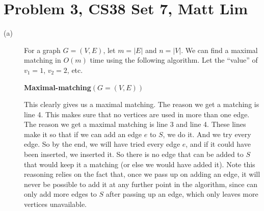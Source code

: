 \documentclass{article}
\begin{document}
\section*{Problem 3, CS38 Set 7, Matt Lim}
\begin{description}
    \item[(a)]
        For a graph $G = (V,E)$, let $m = |E|$ and $n = |V|$.
        We can find a maximal matching in $O(m)$ time using the following
        algorithm. Let the ``value'' of $v_1 = 1$, $v_2 = 2$, etc.

        \vspace{5mm}
        \noindent \textbf{Maximal-matching}$(G = (V,E))$

        This clearly gives us a maximal matching. The reason we get a
        matching is line 4. This makes sure that no vertices are used
        in more than one edge. The reason we get a maximal matching is
        line 3 and line 4. These lines make it so that if we can add an edge $e$
        to $S$, we do it. And we try every edge. So by the end, we will have
        tried every edge $e$, and if it could have been inserted, we inserted it. So
        there is no edge that can be added to $S$ that would keep it a matching
        (or else we would have added it). Note this reasoning relies on the fact
        that, once we pass up on adding an edge, it will never be possible to add
        it at any further point in the algorithm, since can only add more edges
        to $S$ after passing up an edge, which only leaves more vertices
        unavailable.


\end{description}
\end{document}
